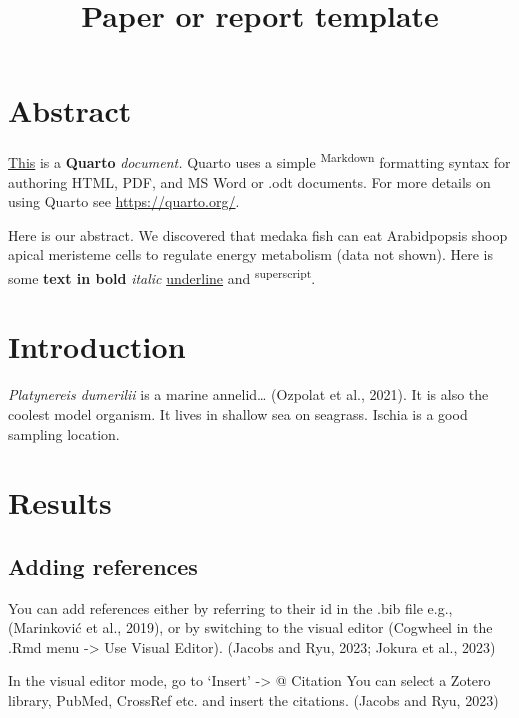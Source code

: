 \documentclass[
  11pt,
]{article}
\title{Paper or report template}
\subtitle{\raggedright

Author 1\textsuperscript{1,2,*} , Author 2\textsuperscript{1,2}, Author
3\textsuperscript{3}, Author 4E\textsuperscript{4}
\newline\textsuperscript{1}Heidelberg University, Centre for Organismal
Studies (COS), 69120 Heidelberg, Germany
\newline\textsuperscript{2}Affiliation 2
\newline\textsuperscript{3}Affiliation 3
\newline\textsuperscript{4}Affiliation 4\newline
\textsuperscript{*}Correspondence: xy@cos.uni-heidelberg.de}
\author{}
\date{}
\renewcommand*\contentsname{Table of contents}
\newcommand\contentsname{Table of contents}
\begin{document}
\maketitle

\linenumbers

\renewcommand*\contentsname{Table of contents}
{
\hypersetup{linkcolor=}
\setcounter{tocdepth}{3}
\tableofcontents
}
\section{Abstract}\label{abstract}

\ul{This} is a \textbf{Quarto} \emph{document.} Quarto uses a simple
\textsuperscript{Markdown} formatting syntax for authoring HTML, PDF,
and MS Word or .odt documents. For more details on using Quarto see
\url{https://quarto.org/}.

Here is our abstract. We discovered that medaka fish can eat
Arabidpopsis shoop apical meristeme cells to regulate energy metabolism
(data not shown). Here is some \textbf{text in bold} \emph{italic}
\ul{underline} and \textsuperscript{superscript}.

\section{Introduction}\label{introduction}

\emph{Platynereis dumerilii} is a marine annelid\ldots{} (Ozpolat et
al., 2021). It is also the coolest model organism. It lives in shallow
sea on seagrass. Ischia is a good sampling location.

\section{Results}\label{results}

\subsection{Adding references}\label{adding-references}

You can add references either by referring to their id in the .bib file
e.g., (Marinković et al., 2019), or by switching to the visual editor
(Cogwheel in the .Rmd menu -\textgreater{} Use Visual Editor). (Jacobs
and Ryu, 2023; Jokura et al., 2023)

In the visual editor mode, go to `Insert' -\textgreater{} @ Citation You
can select a Zotero library, PubMed, CrossRef etc. and insert the
citations. (Jacobs and Ryu, 2023)
\end{document}
